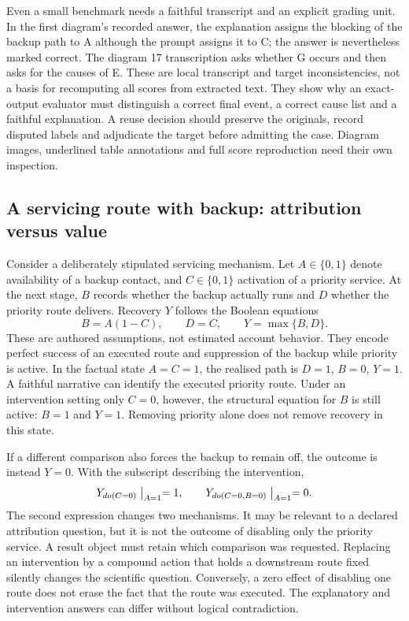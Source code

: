 Even a small benchmark needs a faithful transcript and an explicit grading
unit. In the first diagram's recorded answer, the explanation assigns the
blocking of the backup path to A although the prompt assigns it to C; the
answer is nevertheless marked correct. The diagram 17 transcription asks
whether G occurs and then asks for the causes of E. These are local
transcript and target inconsistencies, not a basis for recomputing all scores
from extracted text. They show why an exact-output evaluator must distinguish
a correct final event, a correct cause list and a faithful explanation. A
reuse decision should preserve the originals, record disputed labels and
adjudicate the target before admitting the case. Diagram images, underlined
table annotations and full score reproduction need their own inspection.~\citep{exec18_reasoning_neuron}

\subsection{A servicing route with backup: attribution versus value}
\label{exec18:reasoning-example}
Consider a deliberately stipulated servicing mechanism. Let $A\in\{0,1\}$
denote availability of a backup contact, and $C\in\{0,1\}$ activation of a
priority service. At the next stage, $B$ records whether the backup actually
runs and $D$ whether the priority route delivers. Recovery $Y$ follows the
Boolean equations
\begin{equation}
 B=A(1-C),\qquad D=C,\qquad Y=\max\{B,D\}.
 \label{exec18:reasoning-mechanism}
\end{equation}
These are authored assumptions, not estimated account behavior. They encode
perfect success of an executed route and suppression of the backup while
priority is active. In the factual state $A=C=1$, the realised path is
$D=1$, $B=0$, $Y=1$. A faithful narrative can identify the executed priority
route. Under an intervention setting only $C=0$, however, the structural
equation for $B$ is still active: $B=1$ and $Y=1$. Removing priority alone
does not remove recovery in this state.~\citep{exec18_reasoning_reference}

If a different comparison also forces the backup to remain off, the outcome
is instead $Y=0$. With the subscript describing the intervention,
\begin{equation}
 Y_{do(C=0)}\bigm|_{A=1}=1,\qquad
 Y_{do(C=0,B=0)}\bigm|_{A=1}=0.
 \label{exec18:reasoning-interventions}
\end{equation}
The second expression changes two mechanisms. It may be relevant to a
declared attribution question, but it is not the outcome of disabling only
the priority service. A result object must retain which comparison was
requested. Replacing an intervention by a compound action that holds a
downstream route fixed silently changes the scientific question. Conversely,
a zero effect of disabling one route does not erase the fact that the route
was executed. The explanatory and intervention answers can differ without
logical contradiction.

